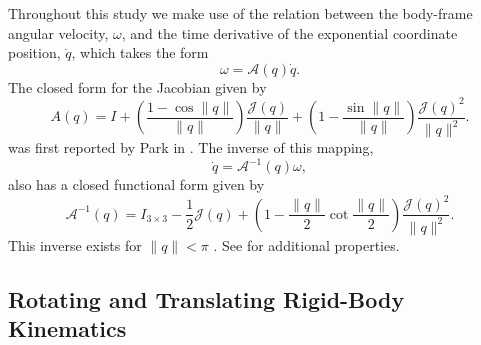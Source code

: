 \noindent Throughout this study we make use of the relation between
the body-frame angular velocity, $\omega$, and the time derivative of
the exponential coordinate position, $\dot{q}$, which takes the form
%
\begin{equation}
\omega=\mathcal{A}(q) \dot{q}.
\end{equation}
%
The closed form for the Jacobian 
given by
%
\begin{equation}\label{chModels.eq.A}
A(q)=I+\left(\frac{1-\cos{\|q\|}}{\|q\|}\right)\frac{\mathcal{J}(q)}{\|q\|}+
\left(1-\frac{\sin{\|q\|}}{\|q\|}\right)\frac{\mathcal{J}(q)^2}{\|q\|^2}.
\end{equation}
%
was first reported by Park in \cite{Park1991}. The inverse of this mapping,
%
\begin{equation}
\dot{q}=\mathcal{A}^{-1}(q)\omega,
\end{equation}
%
 also has a closed functional
  form given by
%
\begin{equation}\label{chModels.eq.Ainv}
  \mathcal{A}^{-1}(q)=I_{3\times 3}-\frac{1}{2}\mathcal{J}(q)+\left(1-\frac{\|q\|}{2}\cot{\frac{\|q\|}{2}}\right)\frac{\mathcal{J}(q)^2}{\|q\|^2}.
\end{equation}
%
This inverse exists for $\|q\|<\pi$ \cite{Park1991}.  See
\cite{Bullo2004,Chirikjian2000} for additional properties.


\subsection{Rotating and Translating Rigid-Body Kinematics}
\label{chModels.sec.SE3}

